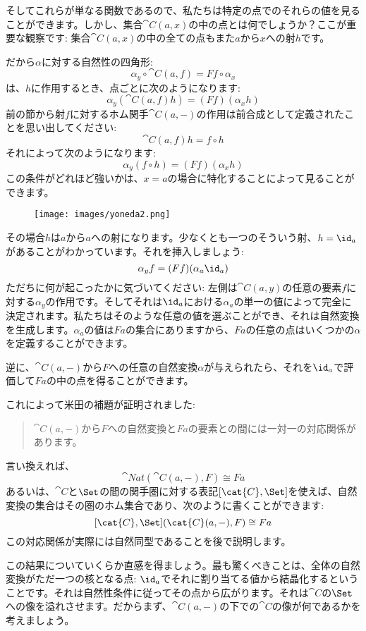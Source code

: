 \noindent
そしてこれらが単なる関数であるので、私たちは特定の点でのそれらの値を見ることができます。しかし、集合$\cat{C}(a, x)$の中の点とは何でしょうか？ここが重要な観察です: 集合$\cat{C}(a, x)$の中の全ての点もまた$a$から$x$への射$h$です。

だから$\alpha$に対する自然性の四角形: 
\[\alpha_y \circ \cat{C}(a, f) = F f \circ \alpha_x\]
は、$h$に作用するとき、点ごとに次のようになります: 
\[\alpha_y (\cat{C}(a, f) h) = (F f) (\alpha_x h)\]
前の節から射$f$に対するホム関手$\cat{C}(a,-)$の作用は前合成として定義されたことを思い出してください: 
\[\cat{C}(a, f) h = f \circ h\]
それによって次のようになります: 
\[\alpha_y (f \circ h) = (F f) (\alpha_x h)\]
この条件がどれほど強いかは、$x = a$の場合に特化することによって見ることができます。

\begin{figure}[H]
  \centering
  \texttt{[image: images/yoneda2.png]}
\end{figure}

\noindent
その場合$h$は$a$から$a$への射になります。少なくとも一つのそういう射、$h = \id_a$があることがわかっています。それを挿入しましょう: 
\[\alpha_y f = (F f) (\alpha_a \id_a)\]
ただちに何が起こったかに気づいてください: 左側は$\cat{C}(a, y)$の任意の要素$f$に対する$\alpha_y$の作用です。そしてそれは$\id_a$における$\alpha_a$の単一の値によって完全に決定されます。私たちはそのような任意の値を選ぶことができ、それは自然変換を生成します。$\alpha_a$の値は$F a$の集合にありますから、$F a$の任意の点はいくつかの$\alpha$を定義することができます。

逆に、$\cat{C}(a, -)$から$F$への任意の自然変換$\alpha$が与えられたら、それを$\id_a$で評価して$F a$の中の点を得ることができます。

これによって米田の補題が証明されました: 

\begin{quote}
  $\cat{C}(a, -)$から$F$への自然変換と$F a$の要素との間には一対一の対応関係があります。
\end{quote}
言い換えれば、
\[\cat{Nat}(\cat{C}(a, -), F) \cong F a\]
あるいは、$\cat{C}$と$\Set$の間の関手圏に対する表記$[\cat{C}, \Set]$を使えば、自然変換の集合はその圏のホム集合であり、次のように書くことができます: 
\[[\cat{C}, \Set](\cat{C}(a, -), F) \cong F a\]
この対応関係が実際には自然同型であることを後で説明します。

この結果についていくらか直感を得ましょう。最も驚くべきことは、全体の自然変換がただ一つの核となる点: $\id_a$でそれに割り当てる値から結晶化するということです。それは自然性条件に従ってその点から広がります。それは$\cat{C}$の$\Set$への像を溢れさせます。だからまず、$\cat{C}(a, -)$の下での$\cat{C}$の像が何であるかを考えましょう。

